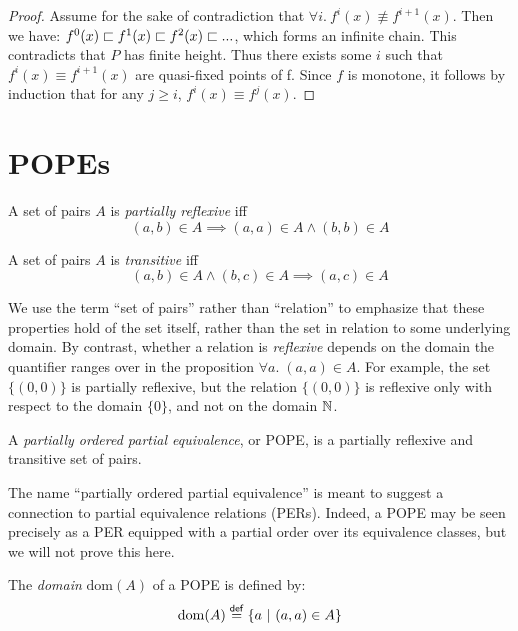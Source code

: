 \documentclass{article}
\newcommand{\dom}[1]{\mathrm{dom}(#1)}
\begin{document}
\begin{proof}
  Assume for the sake of contradiction that $\forall i.\ f^i(x) \not\equiv
  f^{i+1}(x)$. Then we have: \( f^0(x) \sqsubset f^1(x) \sqsubset f^2(x) \sqsubset ... \),
  which forms an infinite chain. This contradicts that $P$ has finite height.
  Thus there exists some $i$ such that $f^i(x) \equiv f^{i+1}(x)$ are
  quasi-fixed points of f. Since $f$ is monotone, it follows by induction that
  for any $j \ge i$, $f^i(x) \equiv f^j(x)$.
\end{proof}


\section{POPEs}

\begin{definition}
  A set of pairs $A$ is \emph{partially reflexive} iff
  \[ (a,b) \in A \implies (a,a) \in A \wedge (b,b) \in A \]
\end{definition}

\begin{definition}
  A set of pairs $A$ is \emph{transitive} iff
  \[ (a,b) \in A \wedge (b,c) \in A \implies (a,c) \in A\]
\end{definition}

We use the term ``set of pairs'' rather than ``relation'' to emphasize that
these properties hold of the set itself, rather than the set in relation to some
underlying domain. By contrast, whether a relation is \emph{reflexive} depends
on the domain the quantifier ranges over in the proposition $\forall a.\; (a,a)
\in A$. For example, the set $\{(0,0)\}$ is partially reflexive, but the
relation $\{(0,0)\}$ is reflexive only with respect to the domain $\{0\}$, and
not on the domain $\mathbb{N}$.

\begin{definition}
  A \emph{partially ordered partial equivalence}, or POPE, is a partially
  reflexive and transitive set of pairs.
\end{definition}

The name ``partially ordered partial equivalence'' is meant to suggest a
connection to partial equivalence relations (PERs). Indeed, a POPE may be seen
precisely as a PER equipped with a partial order over its equivalence classes,
but we will not prove this here.

\begin{definition}
  The \emph{domain} $\dom{A}$ of a POPE is defined by:
  \begin{equation*}
    \dom{A} \defeq \setfor{a}{(a,a) \in A}
  \end{equation*}
\end{definition}
\end{document}
